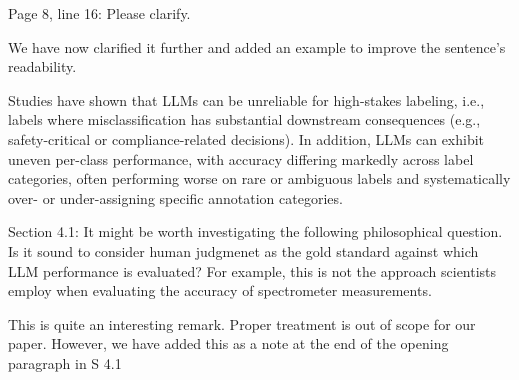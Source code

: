 \documentclass[12pt,english]{reviewresponse}
\newcommand{\CA}[1]{\todo[color=red!40, linecolor=red, bordercolor=red, textcolor=black]{#1}}
\begin{document}
\begin{revcomment}
Page 8, line 16: Please clarify.
\end{revcomment}
\begin{revresponse}
We have now clarified it further and added an example to improve the sentence's readability.
 \begin{changes}
    Studies have shown that LLMs can be unreliable for high-stakes labeling, i.e., labels where misclassification has substantial downstream consequences (e.g., safety-critical or compliance-related decisions). In addition, LLMs can exhibit uneven per-class performance, with accuracy differing markedly across label categories, often performing worse on rare or ambiguous labels and systematically over- or under-assigning specific annotation categories.
    \end{changes}
    
\end{revresponse}

\begin{revcomment}
    Section 4.1: It might be worth investigating the following philosophical question. Is it sound to consider human judgmenet as the gold standard against which LLM performance is evaluated? For example, this is not the approach scientists employ when evaluating the accuracy of spectrometer measurements.
\end{revcomment}
\begin{revresponse}
    This is quite an interesting remark. Proper treatment is out of scope for our paper. However, we have added this as a note at the end of the opening paragraph in S 4.1
\end{revresponse}
\end{document}

